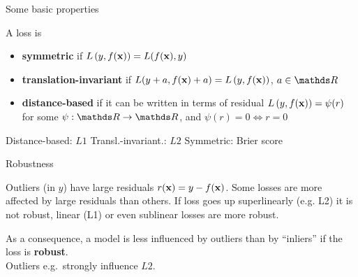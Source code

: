 \documentclass[11pt,compress,t,notes=noshow, xcolor=table]{beamer}
\begin{document}
\begin{frame}{Some basic properties}

A loss is  
\begin{itemize}
\item \textbf{symmetric} if $L\left(y, f(\mathbf{x})\right) = L(f(\mathbf{x}), y)$
\item \textbf{translation-invariant} if $L(y + a, f(\mathbf{x}) + a) = L\left(y, f(\mathbf{x})\right)$, 
$a \in \R$
\item \textbf{distance-based} if it can be written in terms of residual 
$L\left(y, f(\mathbf{x})\right) = \psi (r)$ for some $\psi: \R \to \R$, and 
$\psi(r) = 0 \Leftrightarrow r = 0$
\end{itemize}


\vfill

\splitVThree
{
\small \centering
Distance-based: $L1$
}%
{
\small \centering
Transl.-invariant.: $L2$
}%
{
\small \centering
Symmetric: Brier score
}

\end{frame}


\begin{framev}[fs=small]{Robustness}

Outliers (in $y$) have large residuals $r(\mathbf{x}) = y - f(\mathbf{x})$. Some losses are more
affected by large residuals than others. If loss goes up superlinearly (e.g. L2) it is not robust, linear (L1) or even sublinear losses are more robust.

\vfill

%
{
As a consequence, a model is less influenced by outliers than by ``inliers'' if 
the loss is \textbf{robust}.\\
Outliers e.g.\ strongly influence $L2$.
}%

\vfill


\end{framev}
\end{document}
